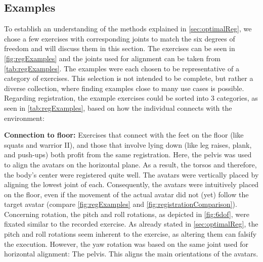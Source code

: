 \subsection*{Examples \label{sec:regExamples}}
To establish an understanding of the methods explained in \autoref{sec:optimalReg}, we chose a few exercises with corresponding joints to match the six degrees of freedom and will discuss them in this section. The exercises can be seen in \autoref{fig:regExamples} and the joints used for alignment can be taken from \autoref{tab:regExamples}. The examples were each chosen to be representative of a category of exercises. This selection is not intended to be complete, but rather a diverse collection, where finding examples close to many use cases is possible. Regarding registration, the example exercises could be sorted into 3 categories, as seen in \autoref{tab:regExamples}, based on how the individual connects with the environment:

\textbf{Connection to floor:}
Exercises that connect with the feet on the floor (like squats and warrior II), and those that involve lying down (like leg raises, plank, and push-ups) both profit from the same registration. Here, the pelvis was used to align the avatars on the horizontal plane. As a result, the torsos and therefore, the body's center were registered quite well. The avatars were vertically placed by aligning the lowest joint of each. Consequently, the avatars were intuitively placed on the floor, even if the movement of the actual avatar did not (yet) follow the target avatar (compare \autoref{fig:regExamples} and \autoref{fig:registrationComparison}). Concerning rotation, the pitch and roll rotations, as depicted in \autoref{fig:6dof}, were fixated similar to the recorded exercise. As already stated in \autoref{sec:optimalReg}, the pitch and roll rotations seem inherent to the exercise, as altering them can falsify the execution. However, the yaw rotation was based on the same joint used for horizontal alignment: The pelvis. This aligns the main orientations of the avatars.

